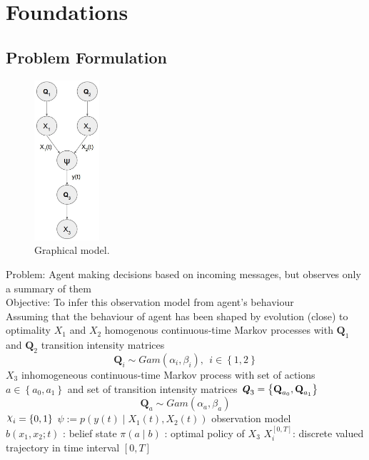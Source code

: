 \DeclareRobustCommand{\rchi}{{\mathpalette\irchi\relax}}
\newcommand{\irchi}[2]{\raisebox{\depth}{$#1\chi$}}

\chapter{Foundations}

\section{Problem Formulation}
\begin{figure}
	\begin{center}
		\includegraphics[width=2.4cm]{figures/h_model}
		\caption{Graphical model.}
	\end{center}
	\label{wrap-fig:1}
\end{figure} 
Problem: Agent making decisions based on incoming messages, but observes only a summary of them \\
Objective: To infer this observation model from agent's behaviour \\
Assuming that the behaviour of agent has been shaped by evolution (close) to optimality
$ X_{1} $ and $ X_{2} $ homogenous continuous-time Markov processes with $ \textbf{Q}_{1} $ and $ \textbf{Q}_{2} $ transition intensity matrices
\begin{equation}
\textbf{Q}_{i} \sim Gam(\alpha_{i}, \beta_{i}),\ \ i \in \left\lbrace 1,2\right\rbrace 
\end{equation}
$X_{3} $ inhomogeneous continuous-time Markov process  with set of actions $ a \in \left\lbrace a_{0}, a_{1}\right\rbrace  $ and set of transition intensity matrices $ \textbf{\textit{Q}}_{3} = \left\lbrace \textbf{Q}_{a_{0}}, \textbf{Q}_{a_{1}} \right\rbrace  $
\begin{equation}
\textbf{Q}_{a} \sim Gam(\alpha_{a}, \beta_{a})
\end{equation}
$ \rchi_{i} = \left\lbrace 0,1\right\rbrace  $
$ \psi  := p(y(t) \mid X_{1}(t), X_{2}(t)) $ observation model\\
$  b(x_{1}, x_{2}; t) $ : belief state
$ \pi(a \mid b) $ : optimal policy of $ X_{3} $
 $ X_{i}^{[0,T]} $: discrete valued trajectory in time interval $ [0, T] $

